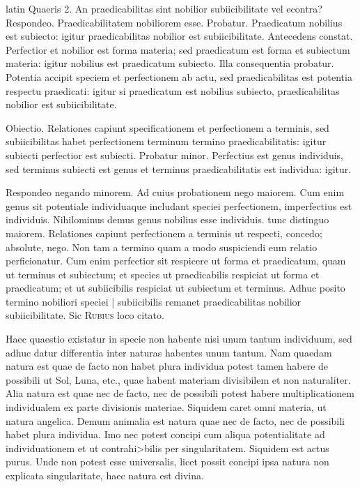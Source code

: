 \begin{otherlanguage*}{latin}
\pstart
Quaeris 2. An praedicabilitas sint nobilior subiicibilitate vel econtra? Respondeo. Praedicabilitatem nobiliorem esse. Probatur. Praedicatum nobilius est subiecto:
igitur praedicabilitas nobilior est subiicibilitate. Antecedens constat. Perfectior et nobilior est forma materia; sed praedicatum est forma et subiectum materia:
igitur nobilius est praedicatum subiecto. Illa consequentia probatur. Potentia accipit speciem et perfectionem ab actu, sed praedicabilitas est potentia respectu praedicati:
igitur si praedicatum est nobilius subiecto, praedicabilitas nobilior est subiicibilitate. 
\pend

\pstart
Obiectio. Relationes capiunt specificationem et perfectionem a terminis, sed subiicibilitas habet perfectionem terminum termino praedicabilitatis:
igitur subiecti perfectior est subiecti. Probatur minor. Perfectius est genus individuis, sed terminus subiecti est genus et terminus praedicabilitatis est individua:
igitur. 
\pend

\pstart
Respondeo negando minorem. Ad cuius probationem nego maiorem. Cum enim genus sit potentiale individuaque includant speciei perfectionem, imperfectius est individuis. Nihilominus demus genus nobilius esse individuis. tunc distinguo maiorem. Relationes capiunt perfectionem a terminis ut respecti, concedo; absolute, nego. Non tam a termino quam a modo suspiciendi eum relatio perficionatur. Cum enim perfectior sit respicere ut forma et praedicatum, quam ut terminus et subiectum; et species ut praedicabilis respiciat ut forma et praedicatum; et ut subiicibilis respiciat ut subiectum et terminus. Adhuc posito termino nobiliori speciei \textnormal{|} subiicibilis remanet praedicabilitas nobilior subiicibilitate. Sic \textsc{Rubius} loco citato. 
\pend

\pstart
{}
\pend

\pstart
Haec quaestio existatur in specie non habente nisi unum tantum individuum, sed adhuc datur differentia inter naturas habentes unum tantum. Nam quaedam natura est quae de facto non habet plura individua potest tamen habere de possibili ut Sol, Luna, etc., quae habent materiam divisibilem et non naturaliter. Alia natura est quae nec de facto, nec de possibili potest habere multiplicationem individualem ex parte divisionis materiae. Siquidem caret omni materia, ut natura angelica. Demum animalia est natura quae nec de facto, nec de possibili habet plura individua. Imo nec potest concipi cum aliqua potentialitate ad individuationem et ut contrahi>bilis per singularitatem. Siquidem est actus purus. Unde non potest esse universalis, licet possit concipi ipsa natura non explicata singularitate, haec natura est divina. 
\pend


\end{otherlanguage*}
